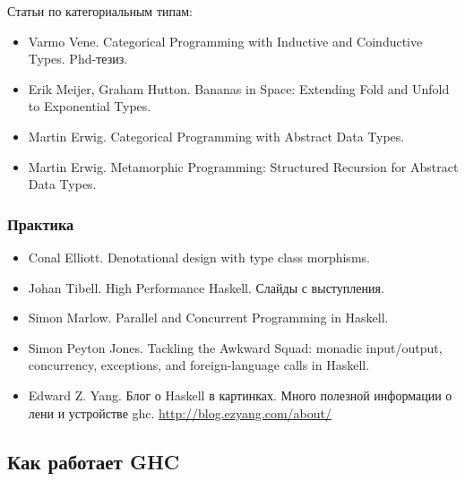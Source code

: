 Статьи по категориальным типам:

\begin{itemize}

\item Varmo Vene. Categorical Programming 
    with Inductive and Coinductive Types. Phd-тезиз.
    
\item Erik Meijer, Graham Hutton.
    Bananas in Space: Extending Fold and Unfold to Exponential Types.

\item Martin Erwig. Categorical Programming with Abstract Data Types.

\item Martin Erwig. Metamorphic Programming: Structured Recursion 
    for Abstract Data Types.

\end{itemize}

\subsubsection{Практика}

\begin{itemize}
\item Conal Elliott. Denotational design with type class morphisms.

\item Johan Tibell. High Performance Haskell. Слайды с выступления. 

\item Simon Marlow. Parallel and Concurrent Programming in Haskell.

\item Simon Peyton Jones. Tackling the Awkward Squad:
    monadic input/output, concurrency, exceptions, and
    foreign-language calls in Haskell.

\item Edward Z. Yang. Блог о Haskell в картинках. Много
    полезной информации о лени и устройстве ghc.
    \url{http://blog.ezyang.com/about/}

\end{itemize}

\subsection{Как работает GHC}

